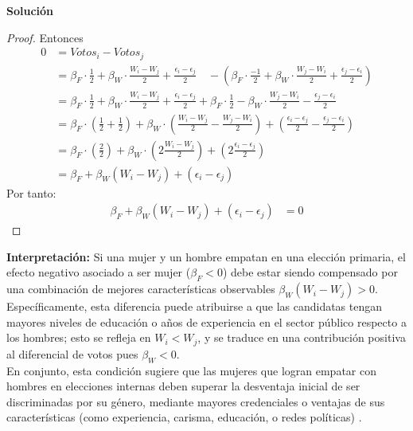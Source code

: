 \documentclass[a4paper, answers, addpoints, 11pt]{exam}
\newenvironment{solucion}{%
  \begin{mdframed}[
    backgroundcolor=blue!5,    %
    linecolor=blue!50,          %
    linewidth=2pt,              %
    leftmargin=10pt,            %
    rightmargin=8pt,           %
    topline=true,              %
    bottomline=true,            %
    roundcorner=10pt,           %
    innerleftmargin=10pt,       %
    innerrightmargin=10pt,      %
    innerbottommargin=10pt,     %
    innertopmargin=10pt         %
  ]%
  \begin{tcolorbox}[colframe=blue!50!black, colback=blue!50, coltitle=white, sharp corners=all, boxrule=1mm, width=\textwidth, halign=left, valign=center, top=0mm, bottom=0mm, left=0mm, right=0mm] \textbf{Solución} \end{tcolorbox} }{\end{mdframed}}
\begin{document}
\begin{enumerate}[resume]
\begin{enumerate}
\begin{solucion}
\begin{proof}
Entonces
\begin{align*}
    0 &= Votos_i - Votos_j \\
    &= \beta_F \cdot \frac{1}{2} + \beta_W \cdot \frac{W_i - W_j}{2} + \frac{\epsilon_i - \epsilon_j}{2} 
    \quad - \left( \beta_F \cdot \frac{-1}{2} + \beta_W \cdot \frac{W_j - W_i}{2} + \frac{\epsilon_j - \epsilon_i}{2} \right) \\
    &= \beta_F \cdot \frac{1}{2} + \beta_W \cdot \frac{W_i - W_j}{2} + \frac{\epsilon_i - \epsilon_j}{2} + \beta_F \cdot \frac{1}{2} - \beta_W \cdot \frac{W_j - W_i}{2} - \frac{\epsilon_j - \epsilon_i}{2} \\
    &= \beta_F \cdot \left( \frac{1}{2} + \frac{1}{2} \right) + \beta_W \cdot \left( \frac{W_i - W_j}{2} - \frac{W_j - W_i}{2} \right) + \left( \frac{\epsilon_i - \epsilon_j}{2} - \frac{\epsilon_j - \epsilon_i}{2} \right) \\
    &= \beta_F \cdot \left( \frac{2}{2} \right) + \beta_W \cdot \left( 2 \frac{W_i - W_j}{2}  \right) + \left( 2\frac{\epsilon_i - \epsilon_j}{2} \right) \\
    &= \beta_F + \beta_W(W_i - W_j) + (\epsilon_i - \epsilon_j) 
\end{align*}
Por tanto:
\begin{align*}
  \beta_F + \beta_W(W_i - W_j) + (\epsilon_i - \epsilon_j) &= 0
\end{align*}
\end{proof}
\textbf{Interpretación:} Si una mujer y un hombre empatan en una elección primaria, el efecto negativo asociado a ser mujer ($\beta_F < 0$) debe estar siendo compensado por una combinación de mejores características observables \(\beta_W(W_i - W_j) > 0 \).  Específicamente, esta diferencia puede  atribuirse a que las candidatas tengan mayores niveles de educación o años de experiencia en el sector público respecto a los hombres; esto se refleja en $W_i < W_j$, y se traduce en una contribución positiva al diferencial de votos pues $\beta_W < 0$. \\ %

En conjunto, esta condición sugiere que las mujeres que logran empatar con hombres en elecciones internas deben superar la desventaja inicial de ser discriminadas por su género, mediante mayores credenciales o ventajas de sus características (como experiencia, carisma, educación, o redes políticas) .



\end{solucion}
\end{enumerate}
\end{enumerate}
\end{document}
